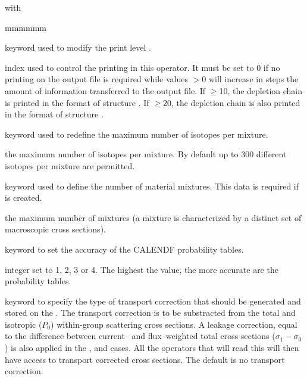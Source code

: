 \noindent
with
\begin{ListeDeDescription}{mmmmmm}

\item[\moc{EDIT}] keyword used to modify the print level .

\item[\dusa{iprint}] index used to control the printing in this operator. It
must be set to 0 if no printing on the output file is required while values
$>$0 will increase in steps the amount of information transferred to the output
file. If $\ge$10, the depletion chain is printed in the format of
structure . If $\ge$20, the depletion chain is also
printed in the format of structure .

\item[\moc{MXIS}] keyword used to redefine the maximum number of isotopes per
mixture.  

\item[\dusa{nmisot}] the maximum number of isotopes per
mixture. By default up to 300 different isotopes per mixture are permitted.

\item[\moc{NMIX}] keyword used to define the number of material mixtures. This
data is required if  is created.

\item[\dusa{nmixt}] the maximum number of mixtures (a mixture
is characterized by a distinct set of macroscopic cross sections). 

\item[\moc{CALENDF}] keyword to set the accuracy of the CALENDF probability
tables.

\item[\dusa{ipreci}] integer set to 1, 2, 3 or 4. The highest the value, the
more accurate are the probability tables.

\item[\moc{CTRA}] keyword to specify the type of transport correction that
should be generated and stored on the . The transport correction is to be
substracted from the total and isotropic ($P_0$) within-group scattering cross sections. A leakage correction, equal 
to the difference between current-- and flux--weighted total cross sections ($\sigma_{1}-\sigma_{0}$)
is also applied in the ,  and  cases. All the operators that
will read this  will then have access to transport corrected
cross sections. The default is no transport correction.


\end{ListeDeDescription}
